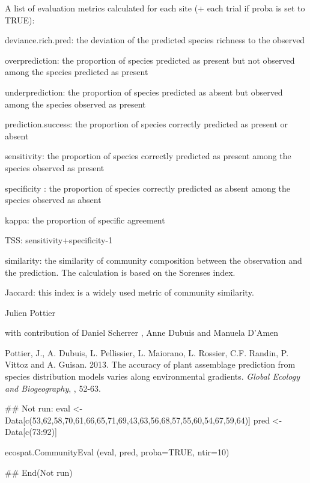 \documentclass[a4paper]{book}
\begin{document}
\begin{Value}
A list of evaluation metrics calculated for each site (+ each trial if proba is set to TRUE):

deviance.rich.pred: the deviation of the predicted species richness to the observed

overprediction: the proportion of species predicted as present but not observed among the species predicted as present

underprediction: the proportion of species predicted as absent but observed among the species observed as present

prediction.success: the proportion of species correctly predicted as present or absent

sensitivity: the proportion of species correctly predicted as present among the species observed as present

specificity : the proportion of species correctly predicted as absent among the species observed as absent

kappa: the proportion of specific agreement

TSS: sensitivity+specificity-1

similarity: the similarity of community composition between the observation and the prediction. The calculation is based on the Sorenses index.

Jaccard: this index is a widely used metric of community similarity.
\end{Value}
%
\begin{Author}\relax
Julien Pottier  

with contribution of Daniel Scherrer , Anne Dubuis  
and Manuela D'Amen 
\end{Author}
%
\begin{References}\relax
Pottier, J., A. Dubuis, L. Pellissier, L. Maiorano, L. Rossier, C.F. Randin, P. Vittoz and A. Guisan. 2013. The accuracy of plant assemblage prediction from species distribution models varies along environmental gradients. \emph{Global Ecology and Biogeography}, , 52-63.
\end{References}
%
\begin{Examples}
\begin{ExampleCode}
## Not run: 
eval <- Data[c(53,62,58,70,61,66,65,71,69,43,63,56,68,57,55,60,54,67,59,64)]
pred <- Data[c(73:92)]

ecospat.CommunityEval (eval, pred, proba=TRUE, ntir=10)

## End(Not run)
\end{ExampleCode}
\end{Examples}
\end{document}
